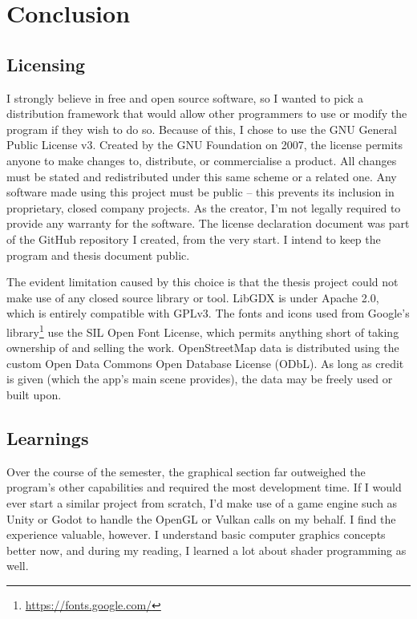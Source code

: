 \chapter{Conclusion}

\label{licensing}
\section{Licensing}

I strongly believe in free and open source software, so I wanted to pick a distribution framework that would allow other programmers to use or modify the program if they wish to do so. Because of this, I chose to use the GNU General Public License v3. Created by the GNU Foundation on 2007, the license permits anyone to make changes to, distribute, or commercialise a product. All changes must be stated and redistributed under this same scheme or a related one. Any software made using this project must be public -- this prevents its inclusion in proprietary, closed company projects. As the creator, I'm not legally required to provide any warranty for the software.\cite{choose-gpl3} The license declaration document was part of the GitHub repository I created, from the very start. I intend to keep the program and thesis document public.

The evident limitation caused by this choice is that the thesis project could not make use of any closed source library or tool. LibGDX is under Apache 2.0, which is entirely compatible with GPLv3. The fonts and icons used from Google's library\footnote{\url{https://fonts.google.com/}} use the SIL Open Font License, which permits anything short of taking ownership of and selling the work. OpenStreetMap data is distributed using the custom Open Data Commons Open Database License (ODbL). As long as credit is given (which the app's main scene provides), the data may be freely used or built upon.

\section{Learnings}

Over the course of the semester, the graphical section far outweighed the program's other capabilities and required the most development time. If I would ever start a similar project from scratch, I'd make use of a game engine such as Unity or Godot to handle the OpenGL or Vulkan calls on my behalf. I find the experience valuable, however. I understand basic computer graphics concepts better now, and during my reading, I learned a lot about shader programming as well.

